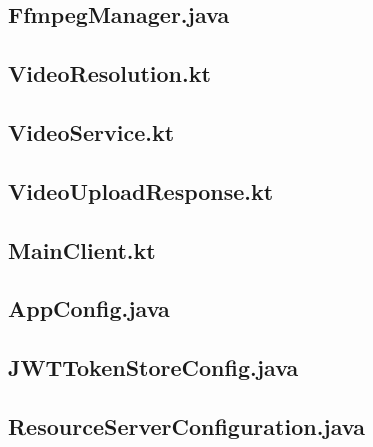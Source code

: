 \documentclass{../includes/TechDoc}
\begin{document}
    \subsection{FfmpegManager.java}
    

    \subsection{VideoResolution.kt}
    

    \subsection{VideoService.kt}
    

    \subsection{VideoUploadResponse.kt}
    

    \subsection{MainClient.kt}
    

    \subsection{AppConfig.java}
    

    \subsection{JWTTokenStoreConfig.java}
    

    \subsection{ResourceServerConfiguration.java}
    
\end{document}
